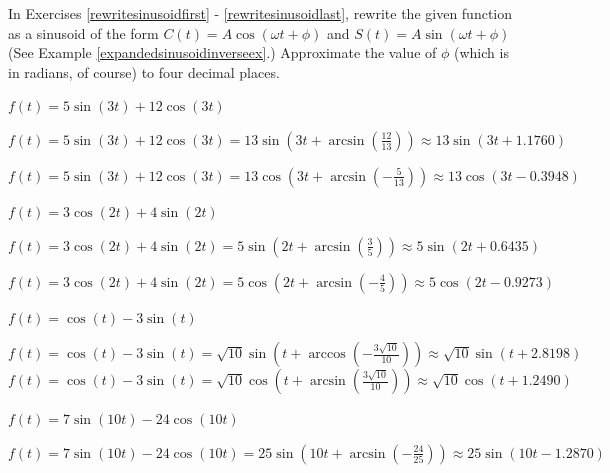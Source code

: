 \documentclass{ximera}
\begin{document}
\begin{question}
In Exercises \ref{rewritesinusoidfirst} - \ref{rewritesinusoidlast}, rewrite the given function as a sinusoid of the form $C(t) = A \cos(\omega t + \phi)$ and $S(t) = A\sin(\omega t + \phi)$ (See Example \ref{expandedsinusoidinverseex}.)  Approximate the value of $\phi$ (which is in radians, of course) to four decimal places.

\begin{problem} \label{rewritesinusoidfirst}
$f(t) = 5\sin(3t) + 12\cos(3t)$ 

\begin{solution}
$f(t) = 5\sin(3t) + 12\cos(3t) = 13\sin\left(3t + \arcsin\left(\frac{12}{13}\right)\right) \approx 13\sin(3t + 1.1760)$

$f(t) = 5\sin(3t) + 12\cos(3t) = 13\cos\left(3t + \arcsin\left(-\frac{5}{13}\right)\right) \approx 13\cos(3t -0.3948)$
\end{solution}
\end{problem}

\begin{problem}
$f(t) = 3\cos(2t) + 4\sin(2t)$

\begin{solution}
$f(t) = 3\cos(2t) + 4\sin(2t) = 5\sin\left(2t+\arcsin\left(\frac{3}{5}\right) \right) \approx 5\sin(2t+0.6435)$

$f(t) = 3\cos(2t) + 4\sin(2t) = 5\cos\left(2t+\arcsin\left(-\frac{4}{5}\right) \right) \approx 5\cos(2t-0.9273)$
\end{solution}
\end{problem}

\begin{problem}
$f(t) = \cos(t) - 3\sin(t)$

\begin{solution}
$f(t) = \cos(t) - 3\sin(t) = \sqrt{10} \sin\left(t + \arccos\left(-\frac{3\sqrt{10}}{10} \right)\right) \approx \sqrt{10} \sin(t + 2.8198)$ \\

$f(t) = \cos(t) - 3\sin(t) = \sqrt{10} \cos\left(t + \arcsin\left(\frac{3\sqrt{10}}{10} \right)\right) \approx \sqrt{10} \cos(t + 1.2490)$
\end{solution}
\end{problem}

\begin{problem}
$f(t) = 7\sin(10t) - 24\cos(10t)$

\begin{solution}
$f(t) = 7\sin(10t) - 24\cos(10t) = 25\sin\left( 10t + \arcsin\left(-\frac{24}{25}\right)\right) \approx 25 \sin(10t-1.2870)$ \\


\end{solution}
\end{problem}
\end{question}
\end{document}
